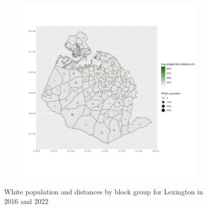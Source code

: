\documentclass[11pt]{article}
\theoremstyle{remark}
\theoremstyle{definition}
\begin{document}
\begin{figure}
\begin{subfigure}{.5\textwidth}
		\includegraphics[width=\linewidth]{result analysis/Lexington_SC_original_configs/white_pop_and_dist_Lexington_config_original_2022_polls.png}
		\label{sfig:Lexington_2022_bg_dist}
	\end{subfigure}
	\caption{White population and distances by block group for Lexington in 2016 and 2022}
	\label{fig:Lexington distance White population maps}
\end{figure}
\end{document}
